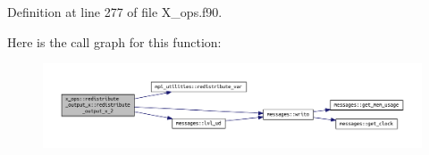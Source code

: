 Definition at line 277 of file X\+\_\+ops.\+f90.

Here is the call graph for this function\+:\nopagebreak
\begin{figure}[H]
\begin{center}
\leavevmode
\includegraphics[width=350pt]{interfacex__ops_1_1redistribute__output__x_a23332572b6281c2e438325875216d863_cgraph}
\end{center}
\end{figure}



